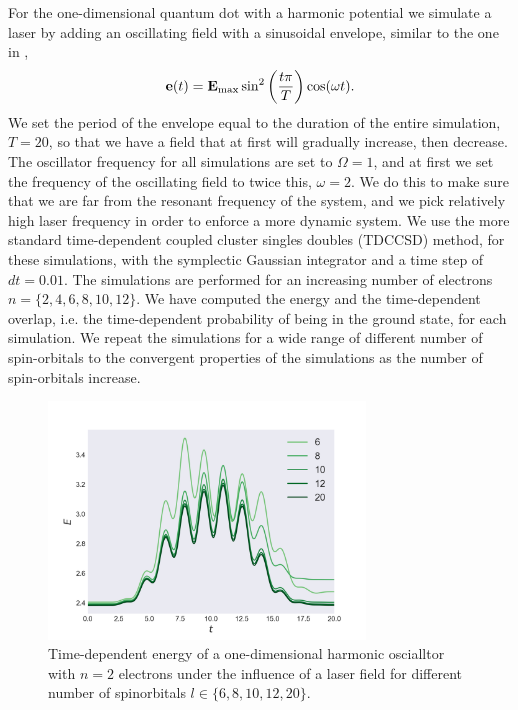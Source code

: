 For the one-dimensional quantum dot with a harmonic potential we simulate a laser by 
adding an oscillating 
field with a sinusoidal envelope, similar to the one in
\citeauthor{pedersen2019symplectic}\cite{pedersen2019symplectic},
\begin{equation}
    \label{eq:results_1d_field}
    \vb{e}(t) = \vb{E}_\text{max}\sin^2\left(\frac{t\pi}{T}\right)\cos(\omega t).
\end{equation}
We set the period of the envelope equal to the duration of the entire simulation,
$T=20$, so that we have a field that at first will gradually increase, then decrease.
The oscillator frequency for all simulations are set to $\Omega=1$, and at first we 
set the frequency of the oscillating field to twice this, $\omega = 2$. We do this 
to make sure that we are far from the resonant frequency of the system, and we pick 
relatively high laser frequency in order to enforce a more dynamic system. We use the 
more standard time-dependent coupled cluster singles doubles (TDCCSD) method, for 
these simulations, with the symplectic Gaussian integrator and a time step of $dt=0.01$.
The simulations are performed for an increasing number of electrons
$n = \{2,4,6,8,10,12\}$. We have computed the energy and the time-dependent overlap,
i.e. the time-dependent probability of being in the ground state, for each simulation.
We repeat the simulations for a wide range of different number of spin-orbitals 
to the convergent properties of the simulations as the number of spin-orbitals increase.

\begin{figure}[ht]
    \centering
    \includegraphics[width=0.75\textwidth]{results/figures/1D/n=2energy.png} 
    \caption{Time-dependent energy of a one-dimensional harmonic oscialltor 
        with $n=2$ electrons
        under the influence of a laser field for different number of spinorbitals
        $l\in\{6,8,10,12,20\}$.
    }
    \label{fig:1d_n2_E}
\end{figure}

